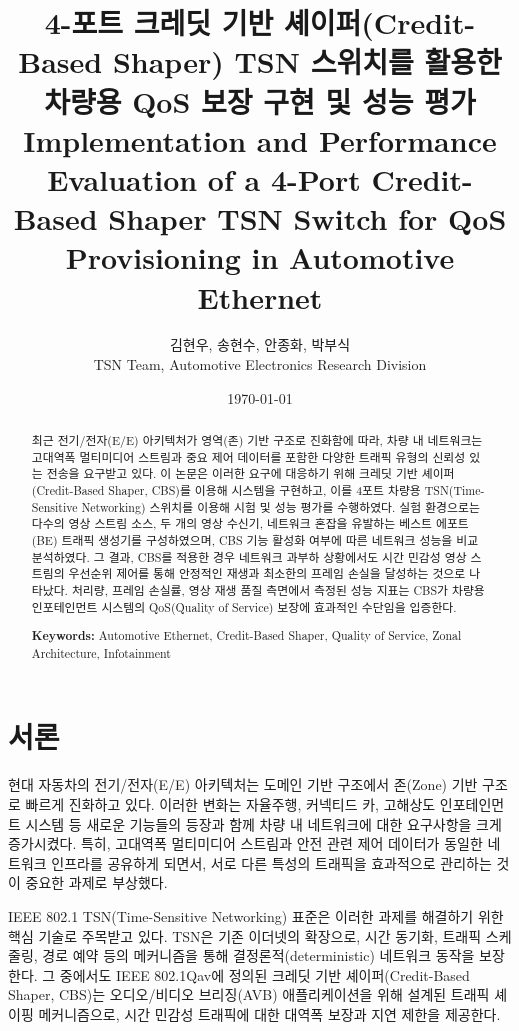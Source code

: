 \documentclass[10pt,twocolumn]{article}
\title{4-포트 크레딧 기반 셰이퍼(Credit-Based Shaper) TSN 스위치를 활용한 차량용 QoS 보장 구현 및 성능 평가\\
\large Implementation and Performance Evaluation of a 4-Port Credit-Based Shaper TSN Switch for QoS Provisioning in Automotive Ethernet}
\author{김현우, 송현수, 안종화, 박부식\\
\small TSN Team, Automotive Electronics Research Division}
\date{\today}
\begin{document}
\maketitle

\begin{abstract}
최근 전기/전자(E/E) 아키텍처가 영역(존) 기반 구조로 진화함에 따라, 차량 내 네트워크는 고대역폭 멀티미디어 스트림과 중요 제어 데이터를 포함한 다양한 트래픽 유형의 신뢰성 있는 전송을 요구받고 있다. 이 논문은 이러한 요구에 대응하기 위해 크레딧 기반 셰이퍼(Credit-Based Shaper, CBS)를 이용해 시스템을 구현하고, 이를 4포트 차량용 TSN(Time-Sensitive Networking) 스위치를 이용해 시험 및 성능 평가를 수행하였다. 실험 환경으로는 다수의 영상 스트림 소스, 두 개의 영상 수신기, 네트워크 혼잡을 유발하는 베스트 에포트(BE) 트래픽 생성기를 구성하였으며, CBS 기능 활성화 여부에 따른 네트워크 성능을 비교 분석하였다. 그 결과, CBS를 적용한 경우 네트워크 과부하 상황에서도 시간 민감성 영상 스트림의 우선순위 제어를 통해 안정적인 재생과 최소한의 프레임 손실을 달성하는 것으로 나타났다. 처리량, 프레임 손실률, 영상 재생 품질 측면에서 측정된 성능 지표는 CBS가 차량용 인포테인먼트 시스템의 QoS(Quality of Service) 보장에 효과적인 수단임을 입증한다.

\textbf{Keywords:} Automotive Ethernet, Credit-Based Shaper, Quality of Service, Zonal Architecture, Infotainment
\end{abstract}

\section{서론}
현대 자동차의 전기/전자(E/E) 아키텍처는 도메인 기반 구조에서 존(Zone) 기반 구조로 빠르게 진화하고 있다. 이러한 변화는 자율주행, 커넥티드 카, 고해상도 인포테인먼트 시스템 등 새로운 기능들의 등장과 함께 차량 내 네트워크에 대한 요구사항을 크게 증가시켰다. 특히, 고대역폭 멀티미디어 스트림과 안전 관련 제어 데이터가 동일한 네트워크 인프라를 공유하게 되면서, 서로 다른 특성의 트래픽을 효과적으로 관리하는 것이 중요한 과제로 부상했다.

IEEE 802.1 TSN(Time-Sensitive Networking) 표준은 이러한 과제를 해결하기 위한 핵심 기술로 주목받고 있다. TSN은 기존 이더넷의 확장으로, 시간 동기화, 트래픽 스케줄링, 경로 예약 등의 메커니즘을 통해 결정론적(deterministic) 네트워크 동작을 보장한다. 그 중에서도 IEEE 802.1Qav에 정의된 크레딧 기반 셰이퍼(Credit-Based Shaper, CBS)는 오디오/비디오 브리징(AVB) 애플리케이션을 위해 설계된 트래픽 셰이핑 메커니즘으로, 시간 민감성 트래픽에 대한 대역폭 보장과 지연 제한을 제공한다.
\end{document}
